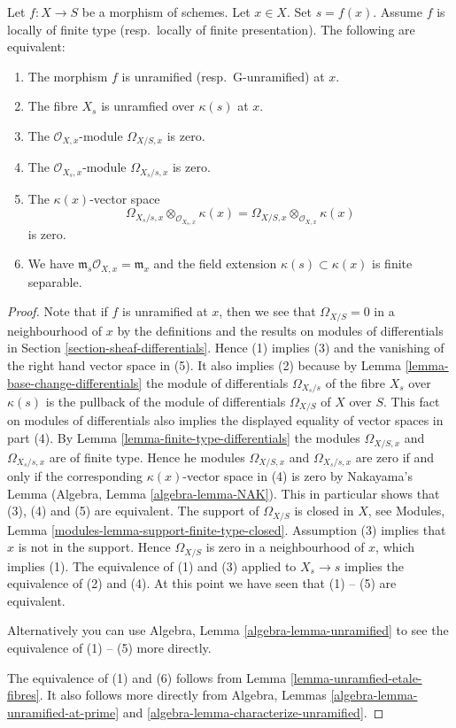 \begin{lemma}
\label{lemma-unramified-at-point}
Let $f : X \to S$ be a morphism of schemes.
Let $x \in X$.
Set $s = f(x)$.
Assume $f$ is locally of finite type (resp.\ locally of finite presentation).
The following are equivalent:
\begin{enumerate}
\item The morphism $f$ is unramified (resp.\ G-unramified) at $x$.
\item The fibre $X_s$ is unramfied over $\kappa(s)$ at $x$.
\item The $\mathcal{O}_{X, x}$-module $\Omega_{X/S, x}$ is zero.
\item The $\mathcal{O}_{X_s, x}$-module $\Omega_{X_s/s, x}$ is zero.
\item The $\kappa(x)$-vector space
$$
\Omega_{X_s/s, x} \otimes_{\mathcal{O}_{X_s, x}} \kappa(x) =
\Omega_{X/S, x} \otimes_{\mathcal{O}_{X, x}} \kappa(x)
$$
is zero.
\item We have $\mathfrak m_s\mathcal{O}_{X, x} = \mathfrak m_x$
and the field extension $\kappa(s) \subset \kappa(x)$ is finite
separable.
\end{enumerate}
\end{lemma}

\begin{proof}
Note that if $f$ is unramified at $x$, then
we see that $\Omega_{X/S} = 0$ in a neighbourhood of $x$
by the definitions and the results on modules of differentials
in Section \ref{section-sheaf-differentials}. Hence (1) implies
(3) and the vanishing of the right hand vector space in (5).
It also implies (2) because by
Lemma \ref{lemma-base-change-differentials}
the module of differentials $\Omega_{X_s/s}$ of the fibre $X_s$
over $\kappa(s)$ is the pullback of the module of differentials
$\Omega_{X/S}$ of $X$ over $S$. This fact on modules of differentials
also implies the displayed equality of vector spaces in part (4). By
Lemma \ref{lemma-finite-type-differentials}
the modules $\Omega_{X/S, x}$ and $\Omega_{X_s/s, x}$ are of finite type.
Hence he modules $\Omega_{X/S, x}$ and $\Omega_{X_s/s, x}$ are zero if and only
if the corresponding $\kappa(x)$-vector space in (4) is zero by
Nakayama's Lemma (Algebra, Lemma \ref{algebra-lemma-NAK}).
This in particular shows that (3), (4) and (5) are equivalent.
The support of $\Omega_{X/S}$ is closed in $X$, see
Modules, Lemma \ref{modules-lemma-support-finite-type-closed}.
Assumption (3) implies that $x$ is not in the support.
Hence $\Omega_{X/S}$ is zero in a neighbourhood of $x$, which
implies (1). The equivalence of (1) and (3) applied to $X_s \to s$
implies the equivalence of (2) and (4).
At this point we have seen that (1) -- (5) are equivalent.

\medskip\noindent
Alternatively you can use Algebra, Lemma \ref{algebra-lemma-unramified}
to see the equivalence of (1) -- (5) more directly.

\medskip\noindent
The equivalence of (1) and (6) follows from Lemma
\ref{lemma-unramfied-etale-fibres}.
It also follows more directly from
Algebra, Lemmas \ref{algebra-lemma-unramified-at-prime} and
\ref{algebra-lemma-characterize-unramified}.
\end{proof}

